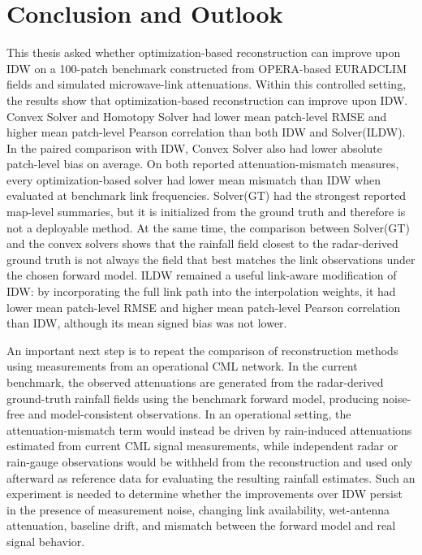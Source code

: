 \documentclass[11pt]{article}
\newcommand{\cleartorecto}{%
  \clearpage
  \ifodd\value{page}
  \else
    \thispagestyle{empty}
    \null
    \clearpage
  \fi
}
\begin{document}
\cleartorecto
\section{Conclusion and Outlook}

This thesis asked whether optimization-based reconstruction can improve upon IDW on a 100-patch benchmark constructed from OPERA-based EURADCLIM fields and simulated microwave-link attenuations. Within this controlled setting, the results show that optimization-based reconstruction can improve upon IDW. {\color{black}Convex Solver and Homotopy Solver had lower mean patch-level RMSE and higher mean patch-level Pearson correlation than both IDW and Solver(ILDW). In the paired comparison with IDW, Convex Solver also had lower absolute patch-level bias on average. On both reported attenuation-mismatch measures, every optimization-based solver had lower mean mismatch than IDW when evaluated at benchmark link frequencies.} Solver(GT) had the strongest reported map-level summaries, but it is initialized from the ground truth and therefore is not a deployable method. At the same time, the comparison between Solver(GT) and the convex solvers shows that the rainfall field closest to the radar-derived ground truth is not always the field that best matches the link observations under the chosen forward model. ILDW remained a useful link-aware modification of IDW: by incorporating the full link path into the interpolation weights, it had lower mean patch-level RMSE and higher mean patch-level Pearson correlation than IDW, although its mean signed bias was not lower.

{\color{black}An important next step is to repeat the comparison of reconstruction methods using measurements from an operational CML network. In the current benchmark, the observed attenuations are generated from the radar-derived ground-truth rainfall fields using the benchmark forward model, producing noise-free and model-consistent observations. In an operational setting, the attenuation-mismatch term would instead be driven by rain-induced attenuations estimated from current CML signal measurements, while independent radar or rain-gauge observations would be withheld from the reconstruction and used only afterward as reference data for evaluating the resulting rainfall estimates. Such an experiment is needed to determine whether the improvements over IDW persist in the presence of measurement noise, changing link availability, wet-antenna attenuation, baseline drift, and mismatch between the forward model and real signal behavior.}
\end{document}
